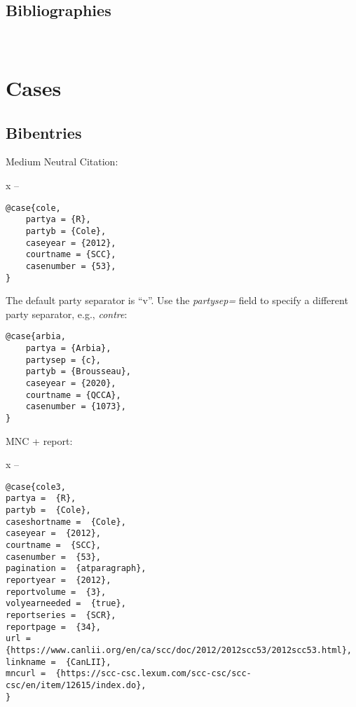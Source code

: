 \subsection{Bibliographies}

\newpage
\let\xoldtwocolumn\twocolumn
\iftoggle{printlegtoc}{%
\let\oldtwocolumn\twocolumn
\renewcommand{\twocolumn}[1][]{#1}
\let\oldclearpage\clearpage
\renewcommand\clearpage{\relax}
\printindex[cases]
\sindex[general]{Table of Cases}
\printindex[legislation]
\iftoggle{printregulations}{\printindex[regulations]}{}
\renewcommand{\twocolumn}[1][]{\oldtwocolumn}
\renewcommand\clearpage{\oldclearpage}
}{}
\bigskip
\hfill{}\hfill\ %
\bigskip


\newpage


\section{Cases}
\subsection{Bibentries}

Medium Neutral Citation: \par\bigskip
  \par
 x -- 
 
\begin{verbatim}
@case{cole,
	partya = {R},
	partyb = {Cole},
	caseyear = {2012},
	courtname = {SCC},
	casenumber = {53},
}
\end{verbatim}

The default party separator is ``v''. Use the \textit{partysep=} field to specify a different party separator, e.g., \textit{contre}: \par\bigskip
 
\begin{verbatim}
@case{arbia,
	partya = {Arbia},
	partysep = {c},
	partyb = {Brousseau},
	caseyear = {2020},
	courtname = {QCCA},
	casenumber = {1073},
}
\end{verbatim}




\newpage
MNC + report: \par\bigskip
 \par
 x -- 
\begin{verbatim}
@case{cole3,	
partya =  {R},	
partyb =  {Cole},	
caseshortname =  {Cole},	
caseyear =  {2012},	
courtname =  {SCC},	
casenumber =  {53},	
pagination =  {atparagraph},	
reportyear =  {2012},	
reportvolume =  {3},	
volyearneeded =  {true},	
reportseries =  {SCR},	
reportpage =  {34},	
url =  {https://www.canlii.org/en/ca/scc/doc/2012/2012scc53/2012scc53.html},	
linkname =  {CanLII},		
mncurl =  {https://scc-csc.lexum.com/scc-csc/scc-csc/en/item/12615/index.do},
}
\end{verbatim}




